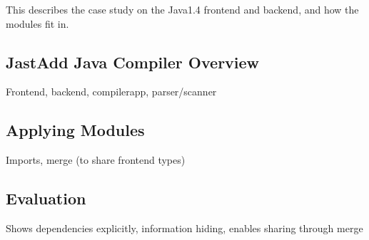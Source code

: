 This describes the case study on the Java1.4 frontend and
backend, and how the modules fit in.

\subsection{JastAdd Java Compiler Overview}

Frontend, backend, compilerapp, parser/scanner

\subsection{Applying Modules}

Imports, merge (to share frontend types)

\subsection{Evaluation}

Shows dependencies explicitly, information hiding, enables sharing through merge